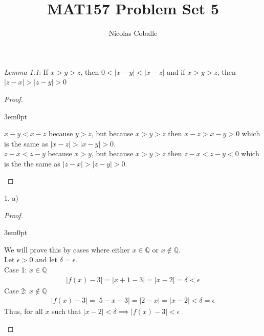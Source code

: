 \documentclass[11pt]{article}
\title{MAT157 Problem Set 5}
\author{Nicolas Coballe}
\newenvironment{myproof}
{\begin{proof} \begin{adjustwidth}{3em}{0pt}$ $\par\nobreak\ignorespaces}
{\end{adjustwidth} \end{proof}}
\begin{document}
\maketitle
\begin{flushleft}

\textit{Lemma 1.1}: If $x>y>z$, then $0<|x-y| < |x-z|$ and if $x>y>z$, then $|z-x| > |z-y|>0$ \\

\begin{myproof}
$x-y < x-z$ because $y>z$, but because $x>y>z$ then $x-z > x-y > 0$ which is the same as $|x-z| > |x-y| > 0$. \\
\bigskip
$z-x < z-y$ because $x > y$, but because $x>y>z$ then $z-x < z-y < 0$ which is the the same as $|z-x| > |z-y| > 0$.
\end{myproof}

1. a)
\begin{myproof}
We will prove this by cases where either $x \in \mathbb{Q}$ or $x \notin \mathbb{Q}$. \\
Let $\epsilon > 0$ and let $\delta = \epsilon$. \\
Case 1: $x \in \mathbb{Q}$
\begin{align*}
|f(x)-3| = |x+1 -3| = |x-2| = \delta < \epsilon
\end{align*}
Case 2: $x \notin \mathbb{Q}$
\begin{align*}
|f(x)-3| = |5-x-3| = |2-x| = |x-2| < \delta = \epsilon
\end{align*}
Thus, for all $x$ such that $|x-2| < \delta \implies |f(x) -3| < \epsilon$
\end{myproof}


\end{flushleft}
\end{document}

